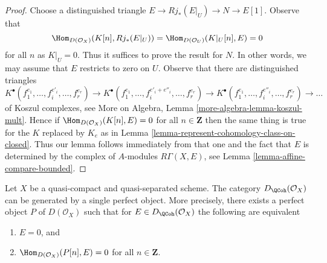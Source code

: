 \begin{proof}
Choose a distinguished triangle $E \to Rj_*(E|_U) \to N \to E[1]$.
Observe that
$$
\Hom_{D(\mathcal{O}_X)}(K[n], Rj_*(E|_U)) =
\Hom_{D(\mathcal{O}_U)}(K|_U[n], E) = 0
$$
for all $n$ as $K|_U = 0$. Thus it suffices to prove the result for
$N$. In other words, we may assume that $E$ restricts to zero on $U$.
Observe that there are distinguished triangles
$$
K^\bullet(f_1^{e_1}, \ldots, f_i^{e'_i}, \ldots, f_r^{e_r}) \to
K^\bullet(f_1^{e_1}, \ldots, f_i^{e'_i + e''_i}, \ldots, f_r^{e_r}) \to
K^\bullet(f_1^{e_1}, \ldots, f_i^{e''_i}, \ldots, f_r^{e_r}) \to \ldots
$$
of Koszul complexes, see
More on Algebra, Lemma \ref{more-algebra-lemma-koszul-mult}.
Hence if $\Hom_{D(\mathcal{O}_X)}(K[n], E) = 0$ for all $n \in \mathbf{Z}$
then the same thing is true for the $K$ replaced by
$K_e$ as in Lemma \ref{lemma-represent-cohomology-class-on-closed}.
Thus our lemma follows immediately from that one and the fact that $E$
is determined by the complex of $A$-modules $R\Gamma(X, E)$, see
Lemma \ref{lemma-affine-compare-bounded}.
\end{proof}

\begin{theorem}
\label{theorem-bondal-van-den-Bergh}
Let $X$ be a quasi-compact and quasi-separated scheme. The category
$D_\QCoh(\mathcal{O}_X)$ can be generated by a single
perfect object. More precisely, there exists a perfect object
$P$ of $D(\mathcal{O}_X)$ such that for 
$E \in D_\QCoh(\mathcal{O}_X)$ the following are equivalent
\begin{enumerate}
\item $E = 0$, and
\item $\Hom_{D(\mathcal{O}_X)}(P[n], E) = 0$ for all $n \in \mathbf{Z}$.
\end{enumerate}
\end{theorem}

